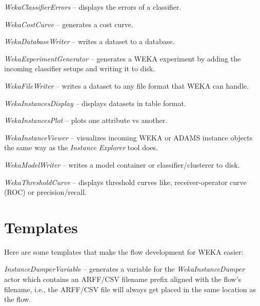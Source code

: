 \begin{tight_itemize}
	\item \textit{WekaClassifierErrors} -- displays the errors of a classifier.
	\item \textit{WekaCostCurve} -- generates a cost curve.
	\item \textit{WekaDatabaseWriter} -- writes a dataset to a database.
	\item \textit{WekaExperimentGenerator} -- generates a WEKA experiment by 
	adding the incoming classifier setups and writing it to disk.
	\item \textit{WekaFileWriter} -- writes a dataset to any file format that
	WEKA can handle.
	\item \textit{WekaInstancesDisplay} -- displays datasets in table format.
	\item \textit{WekaInstancesPlot} -- plots one attribute vs another.
	\item \textit{WekaInstanceViewer} -- visualizes incoming WEKA or ADAMS
	instance objects the same way as the \textit{Instance Explorer} tool does.
	\item \textit{WekaModelWriter} -- writes a model container or 
	classifier/clusterer to disk.
	\item \textit{WekaThresholdCurve} -- displays threshold curves like, 
	receiver-operator curve (ROC) or precision/recall.
\end{tight_itemize}

\section{Templates}
Here are some templates that make the flow development for WEKA easier:
\begin{tight_itemize}
	\item \textit{InstanceDumperVariable} -- generates a variable for the 
	\textit{WekaInstanceDumper} actor which contains an ARFF/CSV filename 
	prefix aligned with the flow's filename, i.e., the ARFF/CSV file will 
	always get placed in the same location as the flow.
\end{tight_itemize}
